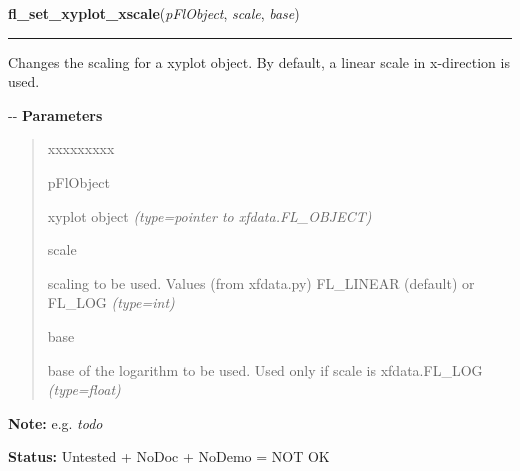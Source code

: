     \label{xformslib:flxyplot:fl_set_xyplot_xscale}

    \vspace{0.5ex}

\hspace{.8\funcindent}\begin{boxedminipage}{\funcwidth}

    \raggedright \textbf{fl\_set\_xyplot\_xscale}(\textit{pFlObject}, \textit{scale}, \textit{base})

    \vspace{-1.5ex}

    \rule{\textwidth}{0.5\fboxrule}
\setlength{\parskip}{2ex}

Changes the scaling for a xyplot object. By default, a linear scale in
x-direction is used.

-{}-
\setlength{\parskip}{1ex}
      \textbf{Parameters}
      \vspace{-1ex}

      \begin{quote}
        \begin{Ventry}{xxxxxxxxx}

          \item[pFlObject]


xyplot object
            {\it (type=pointer to xfdata.FL\_OBJECT)}

          \item[scale]


scaling to be used. Values (from xfdata.py) FL\_LINEAR (default) or
FL\_LOG
            {\it (type=int)}

          \item[base]


base of the logarithm to be used. Used only if scale is xfdata.FL\_LOG
            {\it (type=float)}

        \end{Ventry}

      \end{quote}

\textbf{Note:} 
e.g. \emph{todo}


\textbf{Status:} 
Untested + NoDoc + NoDemo = NOT OK


    \end{boxedminipage}

    \label{xformslib:flxyplot:fl_set_xyplot_yscale}

